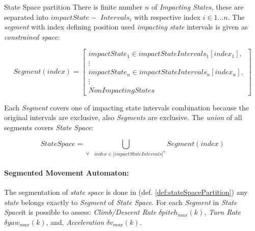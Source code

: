 \begin{definition}{State Space partition}
    There is finite number $n$ of \emph{Impacting States}, these are separated into $impactState-$ $Intervals_i$ with respective index $i \in 1\dots n$. The \emph{segment} with index defining position used \emph{impacting state} intervals is given as \emph{constrained space}:
    
    \begin{equation}
        Segment(index) = \left[
            \begin{gathered}
                impactState_1 \in impactStateIntervals_1[index_1],\\
                \vdots\\
                impactState_n \in impactStateIntervals_n[index_n],\\
                \vdots\\
                NonImpactingStates    
                \end{gathered}\right]
    \end{equation}
    
    Each \emph{Segment} covers one of impacting state intervals combination because the original intervals are exclusive, also \emph{Segments} are exclusive. The \emph{union} of all segments covers \emph{State Space}:
    
    \begin{equation}\label{eq:segmentedStateSpace}
        StateSpace = \bigcup_{\forall\quad index \in |impactStateIntervals|^n} Segment(index)
    \end{equation}
\end{definition}

\paragraph{Segmented Movement Automaton:} The segmentation of \emph{state space} is done  in (def. \ref{def:stateSpacePartition}) any \emph{state} belongs exactly to \emph{Segment} of \emph{State Space}. For each \emph{Segment} in \emph{State Space}it is possible to assess: \emph{Climb/Descent Rate} $\delta pitch_{max}(k)$, \emph{Turn Rate} $\delta yaw_{max}(k)$, and, \emph{Acceleration} $\delta v_{max}(k)$.


